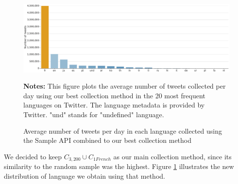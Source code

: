\begin{figure}
\begin{center}
\includegraphics[width=1\textwidth]{figures/HistogramLanguagesFilter.pdf}
\end{center}
\scriptsize \textbf{Notes:} This figure plots the average number of tweets collected per day using our best collection method in the 20 most frequent languages on Twitter. The language metadata is provided by Twitter. "und" stands for "undefined" language.

\caption{Average number of tweets per day in each language collected using the Sample API combined to our best collection method}
\label{Figure:HistogramLanguagesFilter}
\end{figure}



We decided to keep $C_{3,200} \cup C_{1French}$ as our main collection method, since its similarity to the random sample was the highest. Figure \ref{Figure:HistogramLanguagesFilter} illustrates the new distribution of language we obtain using that method.

